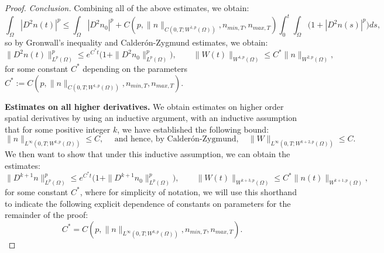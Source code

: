 \documentclass[12pt]{article}
\theoremstyle{plain}
\begin{document}
\begin{proof}
\noindent \textit{Conclusion.} Combining all of the above estimates, we obtain:
\begin{equation*}
\int_{\Omega} |D^{2}n(t)|^{p} \le \int_{\Omega} |D^{2}n_{0}|^{p} + C(p, \|n\|_{C(0, T; W^{1, p}(\Omega))}, n_{min, T}, n_{max, T}) \int_{0}^{t} \int_{\Omega} \Big(1 + |D^{2}n(s)|^{p}\Big) ds,
\end{equation*}
so by Gronwall's inequality and Calder\'{o}n-Zygmund estimates, we obtain:
\begin{equation*}
\|D^{2}n(t)\|_{L^{p}(\Omega)}^{p} \le e^{C^{*}t}\Big(1 + \|D^{2}n_{0}\|_{L^{p}(\Omega)}^{p}\Big), \qquad \|W(t)\|_{W^{4, p}(\Omega)} \le C^{*}\|n\|_{W^{2, p}(\Omega)},
\end{equation*} 
for some constant $C^{*}$ depending on the parameters $C^{*} := C(p, \|n\|_{C(0, T; W^{1, p}(\Omega))}, n_{min, T}, n_{max, T})$.

\medskip

\noindent \textbf{Estimates on all higher derivatives.} We obtain estimates on higher order spatial derivatives by using an inductive argument, with an inductive assumption that for some positive integer $k$, we have established the following bound:
\begin{equation}\label{inductivek}
\|n\|_{L^{\infty}(0, T; W^{k, p}(\Omega))} \le C, \quad \text{ and hence, by Calder\'{o}n-Zygmund}, \quad \|W\|_{L^{\infty}(0, T; W^{k + 2, p}(\Omega))} \le C.
\end{equation}
We then want to show that under this inductive assumption, we can obtain the estimates:
\begin{equation}\label{inductivestep}
\|D^{k + 1}n\|_{L^{p}(\Omega)}^{p} \le e^{C^{*}t}\Big(1 + \|D^{k + 1}n_{0}\|_{L^{p}(\Omega)}^{p}\Big), \qquad \|W(t)\|_{W^{k + 3, p}(\Omega)} \le C^{*}\|n(t)\|_{W^{k + 1, p}(\Omega)},
\end{equation}
for some constant $C^{*}$, where for simplicity of notation, we will use this shorthand to indicate the following explicit dependence of constants on parameters for the remainder of the proof:
\begin{equation}\label{Cstardepend}
C^{*} = C(p, \|n\|_{L^{\infty}(0, T; W^{k, p}(\Omega))}, n_{min, T}, n_{max, T}).
\end{equation}


\end{proof}
\end{document}
